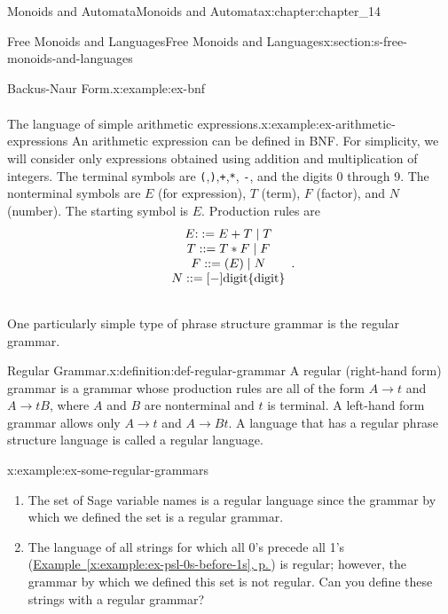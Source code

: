 \documentclass[twoside,10pt,]{book}
\newcommand{\xreffont}{\relax}
\newcommand{\mono}[1]{\texttt{#1}}
\numberwithin{equation}{section}
\begin{document}
\begin{chapterptx}{Monoids and Automata}{}{Monoids and Automata}{}{}{x:chapter:chapter_14}
\begin{sectionptx}{Free Monoids and Languages}{}{Free Monoids and Languages}{}{}{x:section:s-free-monoids-and-languages}
\begin{example}{Backus-Naur Form.}{x:example:ex-bnf}
\begin{equation*}
\begin{array}{l}
\end{array}
\end{equation*}
%
\end{example}
\begin{example}{The language of simple arithmetic expressions.}{x:example:ex-arithmetic-expressions}%
An arithmetic expression can be defined in BNF. For simplicity, we will consider only expressions obtained using addition and multiplication of integers. The terminal symbols are \mono{(},\mono{)},\mono{+},\mono{*}, \mono{-}, and the digits 0 through 9. The nonterminal symbols are \(E\) (for expression), \(T\) (term), \(F\) (factor), and \(N\) (number). The starting symbol is \(E\). Production rules are%
\begin{equation*}
\begin{array}{c}
E\text ::=E+T \mid T\\
T ::=T * F \mid F\\
F ::=(E)\mid N\\ 
N ::=[-]\textrm{digit} \{\textrm{digit}\}\\
\\
\end{array}\text{.}
\end{equation*}
%
\end{example}
One particularly simple type of phrase structure grammar is the regular grammar.%
\begin{definition}{Regular Grammar.}{x:definition:def-regular-grammar}%
%
A regular (right-hand form) grammar is a grammar whose production rules are all of the form \(A\to t\) and  \(A\to tB\), where \(A\) and \(B\) are nonterminal and \(t\) is terminal. A left-hand form grammar allows only \(A \to t\) and  \(A\to Bt\). A language that has a regular phrase structure language is called a regular language.%
\end{definition}
\begin{example}{}{x:example:ex-some-regular-grammars}%
%
\begin{enumerate}[label=(\alph*)]
\item{}The set of Sage variable names is a regular language since the grammar by which we defined the set is a regular grammar.%
\item{}The language of all strings for which all 0's precede all 1's (\hyperref[x:example:ex-psl-0s-before-1s]{Example~{\xreffont\ref{x:example:ex-psl-0s-before-1s}}, p.\,\pageref{x:example:ex-psl-0s-before-1s}}) is regular; however, the grammar by which we defined this set is not regular. Can you define these strings with a regular grammar?%

\end{enumerate}
\end{example}
\end{sectionptx}
\end{chapterptx}
\end{document}
